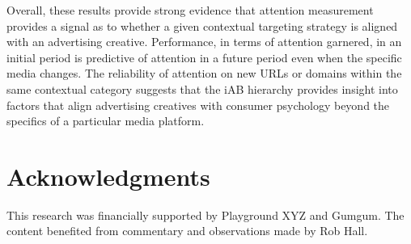 \documentclass[sigconf]{acmart}
\begin{document}
Overall, these results provide strong evidence that attention measurement provides a signal
as to whether a given contextual targeting strategy is aligned with an advertising creative.
Performance, in terms of attention garnered, in an initial period is predictive of
attention in a future period even when the specific media changes.
The reliability of attention on new URLs or domains within the same contextual category
suggests that the iAB hierarchy provides insight into factors that align advertising
creatives with consumer psychology beyond the specifics of a particular media platform.

\section{Acknowledgments}
This research was financially supported by Playground XYZ and Gumgum.
The content benefited from commentary and observations made by Rob Hall.



\end{document}
